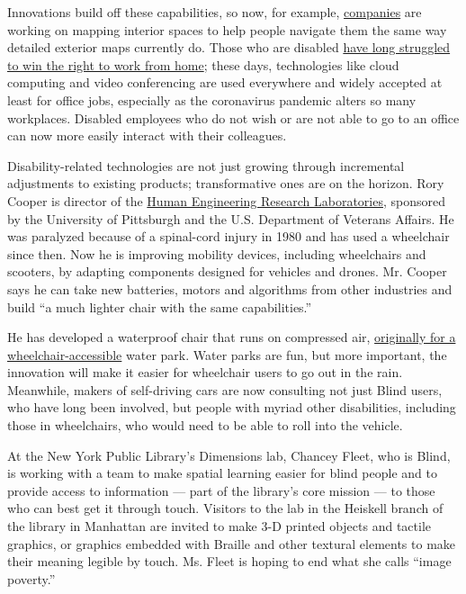Innovations build off these capabilities, so now, for example,
\href{https://www.accessexplorer.net/mapping/}{companies} are working on
mapping interior spaces to help people navigate them the same way
detailed exterior maps currently do. Those who are disabled
\href{https://www.nytimes.com/2020/05/27/at-home/work-from-home-history.html}{have
long struggled to win the right to work from home}; these days,
technologies like cloud computing and video conferencing are used
everywhere and widely accepted at least for office jobs, especially as
the coronavirus pandemic alters so many workplaces. Disabled employees
who do not wish or are not able to go to an office can now more easily
interact with their colleagues.

Disability-related technologies are not just growing through incremental
adjustments to existing products; transformative ones are on the
horizon. Rory Cooper is director of the
\href{https://www.herl.pitt.edu/}{Human Engineering Research
Laboratories}, sponsored by the University of Pittsburgh and the U.S.
Department of Veterans Affairs. He was paralyzed because of a
spinal-cord injury in 1980 and has used a wheelchair since then. Now he
is improving mobility devices, including wheelchairs and scooters, by
adapting components designed for vehicles and drones. Mr. Cooper says he
can take new batteries, motors and algorithms from other industries and
build ``a much lighter chair with the same capabilities.''

He has developed a waterproof chair that runs on compressed air,
\href{https://www.nytimes.com/2017/12/05/opinion/morgans-wonderland-waterpark-kids-play.html}{originally
for a wheelchair-accessible} water park. Water parks are fun, but more
important, the innovation will make it easier for wheelchair users to go
out in the rain. Meanwhile, makers of self-driving cars are now
consulting not just Blind users, who have long been involved, but people
with myriad other disabilities, including those in wheelchairs, who
would need to be able to roll into the vehicle.

At the New York Public Library's Dimensions lab, Chancey Fleet, who is
Blind, is working with a team to make spatial learning easier for blind
people and to provide access to information --- part of the library's
core mission --- to those who can best get it through touch. Visitors to
the lab in the Heiskell branch of the library in Manhattan are invited
to make 3-D printed objects and tactile graphics, or graphics embedded
with Braille and other textural elements to make their meaning legible
by touch. Ms. Fleet is hoping to end what she calls ``image poverty.''

